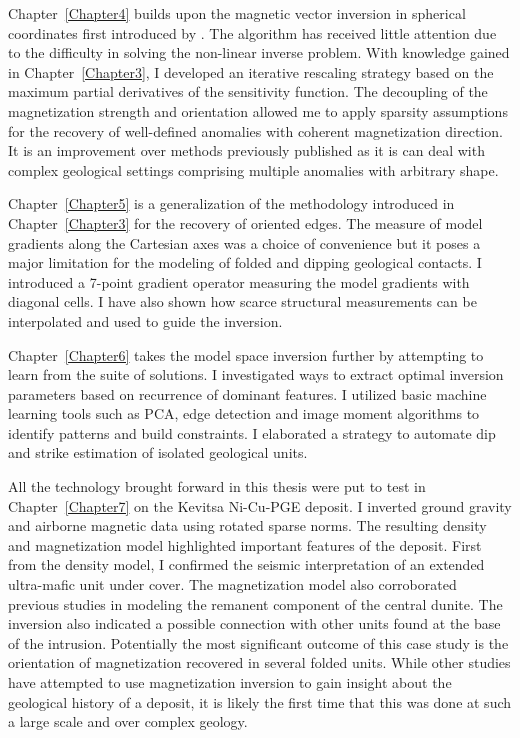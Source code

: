 Chapter~\ref{Chapter4} builds upon the magnetic vector inversion in spherical coordinates first introduced by \cite{PhDLelievre09}. The algorithm has received little attention due to the difficulty in solving the non-linear inverse problem. With knowledge gained in Chapter~\ref{Chapter3}, I developed an iterative rescaling strategy based on the maximum partial derivatives of the sensitivity function. The decoupling of the magnetization strength and orientation allowed me to apply sparsity assumptions for the recovery of well-defined anomalies with coherent magnetization direction. It is an improvement over methods previously published as it is can deal with complex geological settings comprising multiple anomalies with arbitrary shape. 

Chapter~\ref{Chapter5} is a generalization of the methodology introduced in Chapter~\ref{Chapter3} for the recovery of oriented edges. The measure of model gradients along the Cartesian axes was a choice of convenience but it poses a major limitation for the modeling of folded and dipping geological contacts. I introduced a 7-point gradient operator measuring the model gradients with diagonal cells. I have also shown how scarce structural measurements can be interpolated and used to guide the inversion.

Chapter~\ref{Chapter6} takes the model space inversion further by attempting to learn from the suite of solutions. I investigated ways to extract optimal inversion parameters based on recurrence of dominant features. I utilized basic machine learning tools such as PCA, edge detection and image moment algorithms to identify patterns and build constraints. I elaborated a strategy to automate dip and strike estimation of isolated geological units.

All the technology brought forward in this thesis were put to test in Chapter~\ref{Chapter7} on the Kevitsa Ni-Cu-PGE deposit. I inverted ground gravity and airborne magnetic data using rotated sparse norms. The resulting density and magnetization model highlighted important features of the deposit.
First from the density model, I confirmed the seismic interpretation of an extended ultra-mafic unit under cover. The magnetization model also corroborated previous studies in modeling the remanent component of the central dunite. The inversion also indicated a possible connection with other units found at the base of the intrusion.
Potentially the most significant outcome of this case study is the orientation of magnetization recovered in several folded units. While other studies have attempted to use magnetization inversion to gain insight about the geological history of a deposit, it is likely the first time that this was done at such a large scale and over complex geology.

